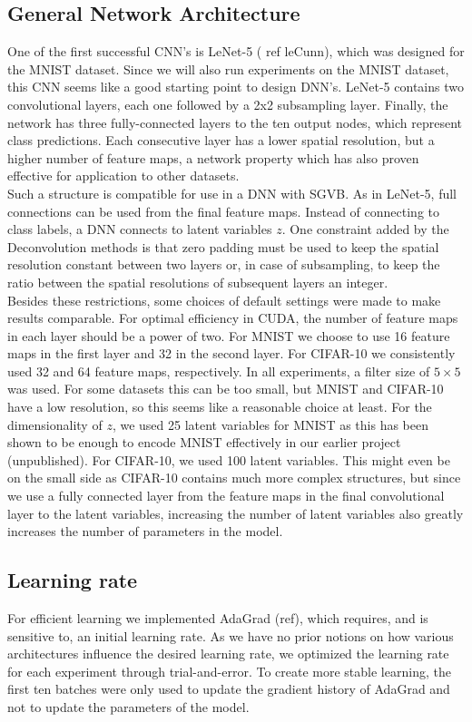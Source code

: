 \subsection{General Network Architecture}
One of the first successful CNN's is LeNet-5 ( ref leCunn), which was designed for the MNIST dataset. Since we will also run experiments on the MNIST dataset, this CNN seems like a good starting point to design DNN's. LeNet-5 contains two convolutional layers, each one followed by a 2x2 subsampling layer. Finally, the network has three fully-connected layers to the ten output nodes, which represent class predictions. Each consecutive layer has a lower spatial resolution, but a higher number of feature maps, a network property which has also proven effective for application to other datasets.\\
Such a structure is compatible for use in a DNN with SGVB. As in LeNet-5, full connections can be used from the final feature maps. Instead of connecting to class labels, a DNN connects to latent variables $z$. One constraint added by the Deconvolution methods is that zero padding must be used to keep the spatial resolution constant between two layers or, in case of subsampling, to keep the ratio between the spatial resolutions of subsequent layers an integer.  \\
Besides these restrictions, some choices of default settings were made to make results comparable. For optimal efficiency in CUDA, the number of feature maps in each layer should be a power of two. For MNIST we choose to use 16 feature maps in the first layer and 32 in the second layer. For CIFAR-10 we consistently used 32 and 64 feature maps, respectively. In all experiments, a filter size of $5 \times 5$ was used. For some datasets this can be too small, but MNIST and CIFAR-10 have a low resolution, so this seems like a reasonable choice at least. For the dimensionality of $z$, we used 25 latent variables for MNIST as this has been shown to be enough to encode MNIST effectively in our earlier project (unpublished). For CIFAR-10, we used 100 latent variables. This might even be on the small side as CIFAR-10 contains much more complex structures, but since we use a fully connected layer from the feature maps in the final convolutional layer to the latent variables, increasing the number of latent variables also greatly increases the number of parameters in the model.

\subsection{Learning rate}

For efficient learning we implemented AdaGrad (ref), which requires, and is sensitive to, an initial learning rate. As we have no prior notions on how various architectures influence the desired learning rate, we optimized the learning rate for each experiment through trial-and-error. To create more stable learning, the first ten batches were only used to update the gradient history of AdaGrad and not to update the parameters of the model.

\newpage